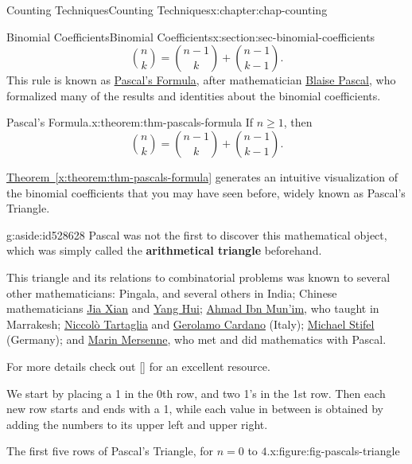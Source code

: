 \documentclass[oneside,10pt,]{book}
\newcommand{\xreffont}{\relax}
\newcommand{\terminology}[1]{\textbf{#1}}
\numberwithin{equation}{section}
\begin{document}
\begin{chapterptx}{Counting Techniques}{}{Counting Techniques}{}{}{x:chapter:chap-counting}
\begin{sectionptx}{Binomial Coefficients}{}{Binomial Coefficients}{}{}{x:section:sec-binomial-coefficients}
\begin{equation*}
\binom{n}{k} = \binom{n-1}{k} + \binom{n-1}{k-1}\text{.}
\end{equation*}
This rule is known as \href{https://en.wikipedia.org/wiki/Pascal\%27s_rule}{Pascal's Formula}, after mathematician \href{https://en.wikipedia.org/wiki/Blaise_Pascal}{Blaise Pascal}, who formalized many of the results and identities about the binomial coefficients.%
\begin{theorem}{Pascal's Formula.}{}{x:theorem:thm-pascals-formula}%
If \(n \geq 1\), then%
\begin{equation*}
\binom{n}{k} = \binom{n-1}{k} + \binom{n-1}{k-1}\text{.}
\end{equation*}
%
\end{theorem}
\hyperref[x:theorem:thm-pascals-formula]{Theorem~{\xreffont\ref{x:theorem:thm-pascals-formula}}} generates an intuitive visualization of the binomial coefficients that you may have seen before, widely known as Pascal's Triangle.%
\begin{aside}{}{g:aside:id528628}%
Pascal was not the first to discover this mathematical object, which was simply called the \terminology{arithmetical triangle} beforehand.%
\par
This triangle and its relations to combinatorial problems was known to several other mathematicians: Pingala, and several others in India; Chinese mathematicians \href{https://en.wikipedia.org/wiki/Jia_Xian}{Jia Xian} and \href{https://en.wikipedia.org/wiki/Yang_Hui}{Yang Hui}; \href{https://en.wikipedia.org/wiki/Ahmad_ibn_Munim_al-Abdari}{Ahmad Ibn Mun'im}, who taught in Marrakesh; \href{https://en.wikipedia.org/wiki/Niccol\%C3\%B2_Fontana_Tartaglia}{Niccolò Tartaglia} and \href{https://en.wikipedia.org/wiki/Gerolamo_Cardano}{Gerolamo Cardano} (Italy); \href{https://en.wikipedia.org/wiki/Michael_Stifel}{Michael Stifel} (Germany); and \href{https://en.wikipedia.org/wiki/Marin_Mersenne}{Marin Mersenne}, who met and did mathematics with Pascal.%
\par
For more details check out \hyperlink{x:biblio:bib-wilson-2013}{[{\xreffont 8}]} for an excellent resource.%
\end{aside}
We start by placing a 1 in the 0th row, and two 1's in the 1st row. Then each new row starts and ends with a 1, while each value in between is obtained by adding the numbers to its upper left and upper right.%
\begin{figureptx}{The first five rows of Pascal's Triangle, for \(n = 0\) to \(4\).}{x:figure:fig-pascals-triangle}{}%

\end{figureptx}
\end{sectionptx}
\end{chapterptx}
\end{document}
